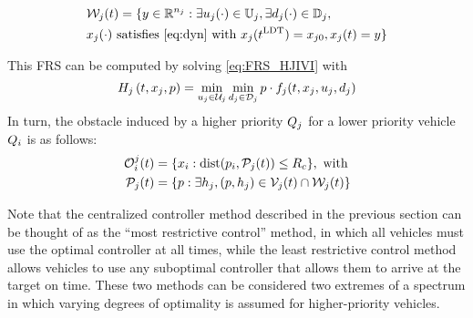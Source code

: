 \begin{equation}
\label{eq:FRS2}
\begin{aligned}
&\mathcal{W}_j(t) = \{y \in \mathbb{R}^{n_j}: \exists u_j(\cdot)\in\mathbb{U}_j, \exists d_j(\cdot) \in \mathbb{D}_j, \\
&x_j(\cdot) \text{ satisfies \eqref{eq:dyn} with }x_j(t^\text{LDT}) = x_{j0}, x_j(t) = y\}
\end{aligned}
\end{equation}

This FRS can be computed by solving \eqref{eq:FRS_HJIVI} with
\vspace{-0.4em}
\begin{equation}
H_j\left(t, x_j, p\right) = \min_{u_j \in \mathcal{U}_j} \min_{d_j \in \mathcal{D}_j} p \cdot f_j(t, x_j, u_j, d_j)
\end{equation}
In turn, the obstacle induced by a higher priority $Q_j$ for a lower priority vehicle $Q_i$ is as follows:
\vspace{-0.4em}
\begin{equation}
\begin{aligned}
\mathcal{O}_i^j(t) &= \{x_i: \text{dist}(p_i, \mathcal{P}_j(t)) \le R_c \}, \text{ with} \\
\mathcal{P}_j(t) &= \{p: \exists h_j, (p, h_j) \in \mathcal{V}_j(t) \cap \mathcal{W}_j(t)\}
\end{aligned}
\end{equation}

Note that the centralized controller method described in the previous section can be thought of as the ``most restrictive control'' method, in which all vehicles must use the optimal controller at all times, while the least restrictive control method allows vehicles to use any suboptimal controller that allows them to arrive at the target on time. These two methods can be considered two extremes of a spectrum in which varying degrees of optimality is assumed for higher-priority vehicles.